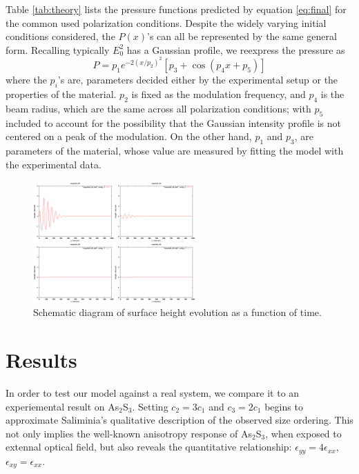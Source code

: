 \documentclass[aps, prl, twocolumn, groupedaddress]{revtex4-1}
\begin{document}
Table \ref{tab:theory} lists the pressure functions predicted by
equation \ref{eq:final} for the common used polarization
conditions. Despite the widely varying initial conditions considered,
the $P(x)$'s can all be represented by the same general
form. Recalling typically $E_0^2$ has a Gaussian profile, we reexpress
the pressure as
\begin{equation}
  P = p_1 e^{-2\left(x/p_2\right)^2}\left[p_3+\cos\left( p_4 x +p_5\right)\right]
  \label{eq:presmod}
\end{equation}
where the $p_i$'s are, parameters decided either by the experimental
setup or the properties of the material. $p_2$ is fixed as the
modulation frequency, and $p_4$ is the beam radius, which are the same
across all polarization conditions; with $p_5$ included to account for
the possibility that the Gaussian intensity profile is not centered on
a peak of the modulation.  On the other hand, $p_1$ and $p_3$, are
parameters of the material, whose value are measured by fitting the
model with the experimental data.

\begin{figure}[!htbp]
  \includegraphics[width=2.45in]{figure/var_para.png}
  \caption{Schematic diagram of surface height evolution as a function
  of time.}
  \label{fig:varPara}
\end{figure}

\section{Results}
In order to test our model against a real system, we compare it to an
experiemental result on As$_2$S$_3$\cite{saliminia}. Setting $c_2 =
3c_1$ and $c_3 = 2c_1$ begins to approximate Saliminia's qualitative
description of the observed size ordering. This not only implies the
well-known anisotropy response of As$_2$S$_3$, when exposed to
extennal optical field, but also reveals the quantitative
relationship: $\epsilon_{yy} = 4\epsilon_{xx}$, $\epsilon_{xy} =
\epsilon_{xx}$.
\end{document}
